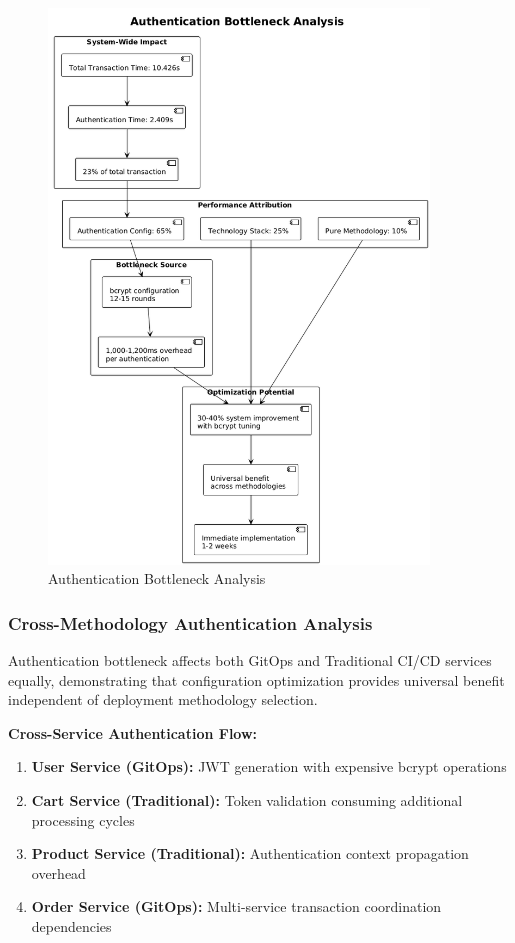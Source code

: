 \begin{figure}[H]
\centering
\includegraphics[width=0.9\textwidth]{figures/Authentication-Bottleneck-Analysis.png}
\caption{Authentication Bottleneck Analysis}
\label{fig:authentication-bottleneck-analysis}
\end{figure}

\subsubsection{Cross-Methodology Authentication Analysis}

Authentication bottleneck affects both GitOps and Traditional CI/CD services equally, demonstrating that configuration optimization provides universal benefit independent of deployment methodology selection.

\textbf{Cross-Service Authentication Flow:}
\begin{enumerate}
\item \textbf{User Service (GitOps):} JWT generation with expensive bcrypt operations
\item \textbf{Cart Service (Traditional):} Token validation consuming additional processing cycles
\item \textbf{Product Service (Traditional):} Authentication context propagation overhead
\item \textbf{Order Service (GitOps):} Multi-service transaction coordination dependencies
\end{enumerate}


